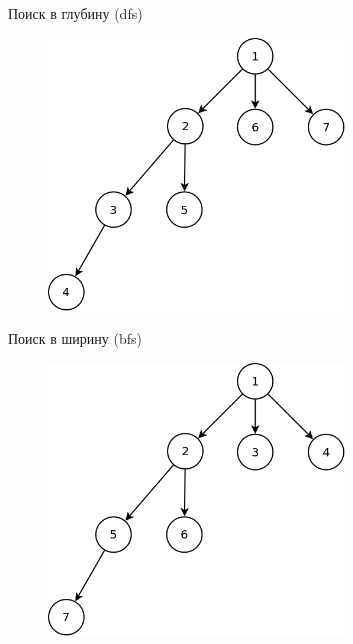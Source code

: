 \documentclass[10pt, mathserif]{beamer}
\theoremstyle{definition}
\begin{document}
\begin{frame}[fragile]{Поиск в глубину (dfs)}
\begin{figure}
\centering
\includegraphics[width=0.7\textwidth]{dfs.png}
\end{figure}
\end{frame}

\begin{frame}[fragile]{Поиск в ширину (bfs)}
\begin{figure}
\centering
\includegraphics[width=0.7\textwidth]{bfs.png}
\end{figure}
\end{frame}
\end{document}
